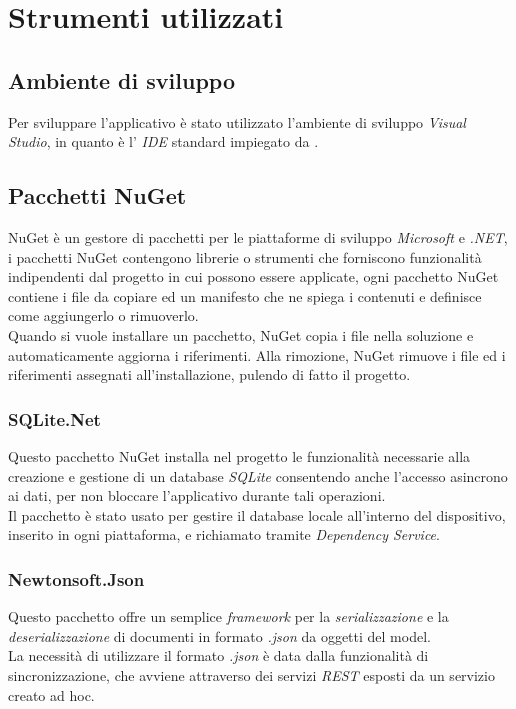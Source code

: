 \section{Strumenti utilizzati}
\subsection{Ambiente di sviluppo}
Per sviluppare l'applicativo è stato utilizzato l'ambiente di sviluppo \textit{Visual Studio}, in quanto è l' \textit{IDE} standard impiegato da \asi.

\subsection{Pacchetti NuGet}
NuGet è un gestore di pacchetti per le piattaforme di sviluppo \textit{Microsoft} e \textit{.NET}, i pacchetti NuGet contengono librerie o strumenti che forniscono funzionalità indipendenti dal progetto in cui possono essere applicate, ogni pacchetto NuGet contiene i file da copiare ed un manifesto che ne spiega i contenuti e definisce come aggiungerlo o rimuoverlo.
\\
Quando si vuole installare un pacchetto, NuGet copia i file nella soluzione e automaticamente aggiorna i riferimenti. Alla rimozione, NuGet rimuove i file ed i riferimenti assegnati all'installazione, pulendo di fatto il progetto.

\subsubsection{SQLite.Net}
Questo pacchetto NuGet installa nel progetto le funzionalità necessarie alla creazione e gestione di un database \textit{SQLite} consentendo anche l'accesso asincrono ai dati, per non bloccare l'applicativo durante tali operazioni.
\\
Il pacchetto è stato usato per gestire il database locale all'interno del dispositivo, inserito in ogni piattaforma, e richiamato tramite \textit{Dependency Service}.

\subsubsection{Newtonsoft.Json}
Questo pacchetto offre un semplice \textit{framework} per la \textit{serializzazione} e la \textit{deserializzazione} di documenti in formato \textit{.json} da oggetti del model.
\\
La necessità di utilizzare il formato \textit{.json} è data dalla funzionalità di sincronizzazione, che avviene attraverso dei servizi \textit{REST} esposti da un servizio creato ad hoc.


